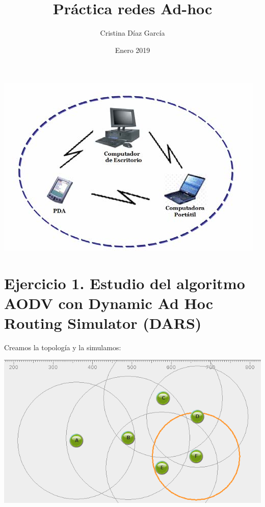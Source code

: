 \documentclass{article}
\title{Práctica redes Ad-hoc}
\author{Cristina Díaz García}
\date{Enero 2019}
\begin{document}

\begin{titlingpage}
\maketitle

\begin{center}
\includegraphics[scale=0.6]{adhoc.png} 
\end{center}

\end{titlingpage}

\newpage

\tableofcontents

\newpage

\section{Ejercicio 1. Estudio del algoritmo AODV con Dynamic Ad Hoc Routing Simulator (DARS)}

Creamos la topología y la simulamos:

\begin{center}
\includegraphics[scale=0.4]{sc.png} 
\end{center}
\end{document}
